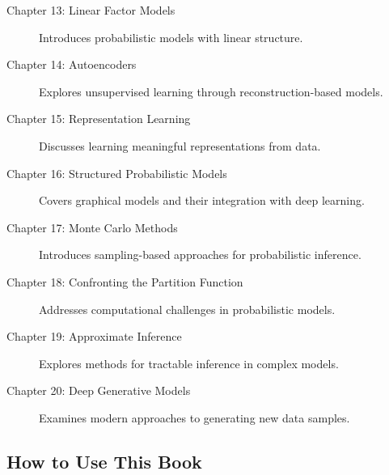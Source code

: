 \begin{description}
    \item[Chapter 13: Linear Factor Models] Introduces probabilistic models with linear structure.
    
    \item[Chapter 14: Autoencoders] Explores unsupervised learning through reconstruction-based models.
    
    \item[Chapter 15: Representation Learning] Discusses learning meaningful representations from data.
    
    \item[Chapter 16: Structured Probabilistic Models] Covers graphical models and their integration with deep learning.
    
    \item[Chapter 17: Monte Carlo Methods] Introduces sampling-based approaches for probabilistic inference.
    
    \item[Chapter 18: Confronting the Partition Function] Addresses computational challenges in probabilistic models.
    
    \item[Chapter 19: Approximate Inference] Explores methods for tractable inference in complex models.
    
    \item[Chapter 20: Deep Generative Models] Examines modern approaches to generating new data samples.
\end{description}

\subsection{How to Use This Book}

